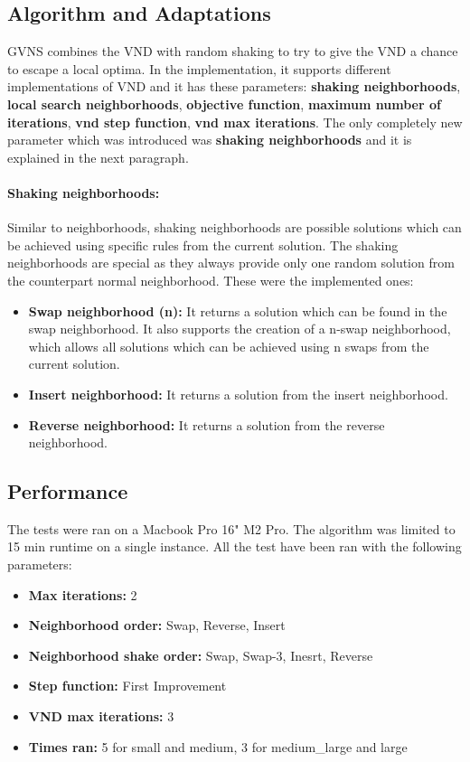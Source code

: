 \documentclass{article}
\begin{document}
\subsection*{Algorithm and Adaptations}
GVNS combines the VND with random shaking to try to give the VND a chance to escape a local optima. In the implementation, it supports different implementations of VND and it has these parameters:  \textbf{shaking neighborhoods},  \textbf{local search neighborhoods},  \textbf{objective function},  \textbf{maximum number of iterations},  \textbf{vnd step function},  \textbf{vnd max iterations}. The only completely new parameter which was introduced was \textbf{shaking neighborhoods} and it is explained in the next paragraph.

\paragraph{Shaking neighborhoods:}
Similar to neighborhoods, shaking neighborhoods are possible solutions which can be achieved using specific rules from the current solution. The shaking neighborhoods are special as they always provide only one random solution from the counterpart normal neighborhood. These were the implemented ones:
\begin{itemize}
	\item \textbf{Swap neighborhood (n):} It returns a solution which can be found in the swap neighborhood. It also supports the creation of a n-swap neighborhood, which allows all solutions which can be achieved using n swaps from the current solution.
	\item \textbf{Insert neighborhood:} It returns a solution from the insert neighborhood.
	\item \textbf{Reverse neighborhood:} It returns a solution from the reverse neighborhood.
\end{itemize}

\subsection*{Performance}
The tests were ran on a Macbook Pro 16" M2 Pro.  The algorithm was limited to 15 min runtime on a single instance. All the test have been ran with the following parameters: 
\begin{itemize}
	\item \textbf{Max iterations:} 2
	\item \textbf{Neighborhood order:} Swap, Reverse, Insert
	\item \textbf{Neighborhood shake order:} Swap, Swap-3, Inesrt, Reverse
	\item \textbf{Step function:} First Improvement
	\item \textbf{VND max iterations:} 3
	\item \textbf{Times ran:} 5 for small and medium, 3 for medium\_large and large
\end{itemize}
\end{document}
